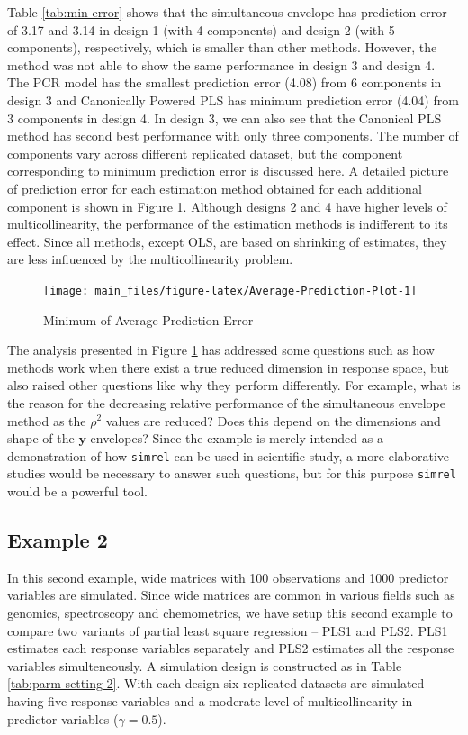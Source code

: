 \documentclass[review]{elsarticle}
\theoremstyle{definition}
\theoremstyle{definition}
\theoremstyle{definition}
\theoremstyle{remark}
\begin{document}
Table \ref{tab:min-error} shows that the simultaneous envelope has
prediction error of 3.17 and 3.14 in design 1 (with 4 components) and
design 2 (with 5 components), respectively, which is smaller than other
methods. However, the method was not able to show the same performance
in design 3 and design 4. The PCR model has the smallest prediction
error (4.08) from 6 components in design 3 and Canonically Powered PLS
has minimum prediction error (4.04) from 3 components in design 4. In
design 3, we can also see that the Canonical PLS method has second best
performance with only three components. The number of components vary
across different replicated dataset, but the component corresponding to
minimum prediction error is discussed here. A detailed picture of
prediction error for each estimation method obtained for each additional
component is shown in Figure \ref{fig:Average-Prediction-Plot}. Although
designs 2 and 4 have higher levels of multicollinearity, the performance
of the estimation methods is indifferent to its effect. Since all
methods, except OLS, are based on shrinking of estimates, they are less
influenced by the multicollinearity problem.

\begin{figure}[!htb]
\texttt{[image: main\_files/figure-latex/Average-Prediction-Plot-1]} \caption{Minimum of Average Prediction Error}\label{fig:Average-Prediction-Plot}
\end{figure}

The analysis presented in Figure \ref{fig:Average-Prediction-Plot} has
addressed some questions such as how methods work when there exist a
true reduced dimension in response space, but also raised other
questions like why they perform differently. For example, what is the
reason for the decreasing relative performance of the simultaneous
envelope method as the \(\rho^2\) values are reduced? Does this depend
on the dimensions and shape of the \(\mathbf{y}\) envelopes? Since the
example is merely intended as a demonstration of how \texttt{simrel} can
be used in scientific study, a more elaborative studies would be
necessary to answer such questions, but for this purpose \texttt{simrel}
would be a powerful tool.

\subsection{Example 2}\label{example-2}

In this second example, wide matrices with 100 observations and 1000
predictor variables are simulated. Since wide matrices are common in
various fields such as genomics, spectroscopy and chemometrics, we have
setup this second example to compare two variants of partial least
square regression -- PLS1 and PLS2. PLS1 estimates each response
variables separately and PLS2 estimates all the response variables
simulteneously. A simulation design is constructed as in Table
\ref{tab:parm-setting-2}. With each design six replicated datasets are
simulated having five response variables and a moderate level of
multicollinearity in predictor variables (\(\gamma = 0.5\)).
\end{document}
